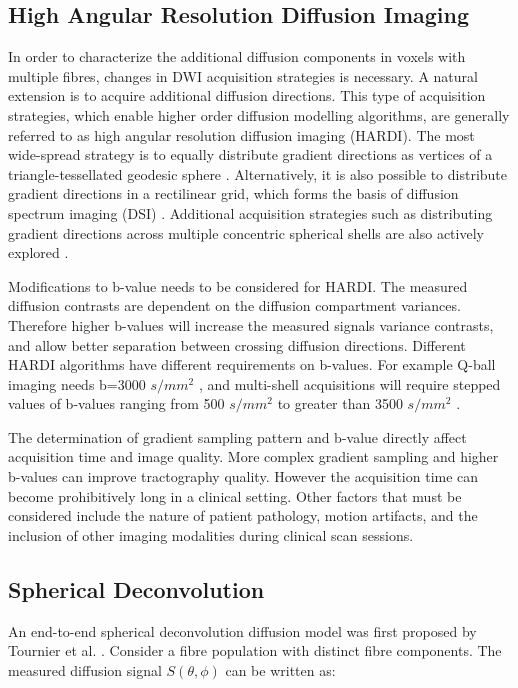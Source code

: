 \subsection{High Angular Resolution Diffusion Imaging}

In order to characterize the additional diffusion components in voxels with multiple fibres, changes in DWI acquisition strategies is necessary. A natural extension is to acquire additional diffusion directions. This type of acquisition strategies, which enable higher order diffusion modelling algorithms, are generally referred to as high angular resolution diffusion imaging (HARDI). The most wide-spread strategy is to equally distribute gradient directions as vertices of a triangle-tessellated geodesic sphere \cite{Frank2001}. Alternatively, it is also possible to distribute gradient directions in a rectilinear grid, which forms the basis of diffusion spectrum imaging (DSI) \cite{Wedeen2005}. Additional acquisition strategies such as distributing gradient directions across multiple concentric spherical shells are also actively explored \cite{Jeurissen2014a}. 

Modifications to b-value needs to be considered for HARDI. The measured diffusion contrasts are dependent on the diffusion compartment variances. Therefore higher b-values will increase the measured signals variance contrasts, and allow better separation between crossing diffusion directions. Different HARDI algorithms have different requirements on b-values. For example Q-ball imaging needs b=3000 $s/mm^2$ \cite{Descoteaux2007a}, and multi-shell acquisitions will require stepped values of b-values ranging from 500  $s/mm^2 $  to greater than 3500  $s/mm^2 $ \cite{Tournier2013}. 

The determination of gradient sampling pattern and b-value directly affect acquisition time and image quality. More complex gradient sampling and higher b-values can improve tractography quality. However the acquisition time can become prohibitively long in a clinical setting. Other factors that must be considered include the nature of patient pathology, motion artifacts, and the inclusion of other imaging modalities during clinical scan sessions. 

\subsection{Spherical Deconvolution}

An end-to-end spherical deconvolution diffusion model was first proposed by Tournier et al. \cite{Tournier2004}. 
Consider a fibre population with distinct fibre components. The measured diffusion signal $S(\theta,\phi)$ can be written as:

